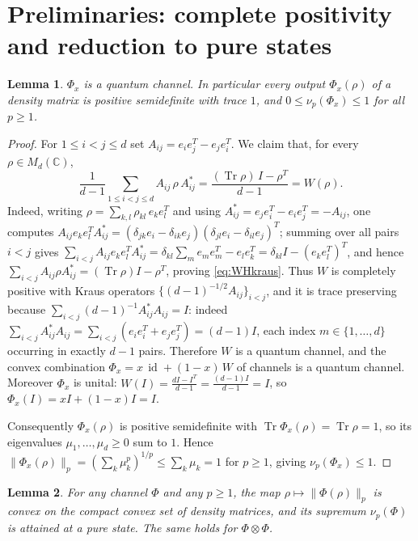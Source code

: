 \documentclass{amsart}
\newtheorem{lemma}{Lemma}
\theoremstyle{definition}
\DeclareMathOperator{\Tr}{Tr}
\DeclareMathOperator{\id}{id}
\begin{document}
\section{Preliminaries: complete positivity and reduction to pure states}
\label{sec:cptp}

\begin{lemma}\label{lem:cptp}
$\Phi_x$ is a quantum channel. In particular every output $\Phi_x(\rho)$ of a
density matrix is positive semidefinite with trace $1$, and
$0\le\nu_p(\Phi_x)\le 1$ for all $p\ge1$.
\end{lemma}

\begin{proof}
For $1\le i<j\le d$ set $A_{ij}=e_ie_j^{T}-e_je_i^{T}$. We claim that, for every
$\rho\in M_d(\mathbb C)$,
\begin{equation}\label{eq:WHkraus}
\frac{1}{d-1}\sum_{1\le i<j\le d}A_{ij}\,\rho\,A_{ij}^{*}
=\frac{(\Tr\rho)\,I-\rho^{T}}{d-1}=W(\rho).
\end{equation}
Indeed, writing $\rho=\sum_{k,l}\rho_{kl}\,e_ke_l^{T}$ and using
$A_{ij}^{*}=e_je_i^{T}-e_ie_j^{T}=-A_{ij}$, one computes
$A_{ij}e_ke_l^{T}A_{ij}^{*}
=(\delta_{jk}e_i-\delta_{ik}e_j)(\delta_{jl}e_i-\delta_{il}e_j)^{T}$;
summing over all pairs $i<j$ gives
$\sum_{i<j}A_{ij}e_ke_l^{T}A_{ij}^{*}
=\delta_{kl}\sum_{m}e_me_m^{T}-e_le_k^{T}
=\delta_{kl}I-(e_ke_l^{T})^{T}$, and hence
$\sum_{i<j}A_{ij}\rho A_{ij}^{*}=(\Tr\rho)I-\rho^{T}$, proving
\eqref{eq:WHkraus}. Thus $W$ is completely positive with Kraus operators
$\{(d-1)^{-1/2}A_{ij}\}_{i<j}$, and it is trace preserving because
$\sum_{i<j}(d-1)^{-1}A_{ij}^{*}A_{ij}=I$: indeed
$\sum_{i<j}A_{ij}^{*}A_{ij}=\sum_{i<j}(e_ie_i^{T}+e_je_j^{T})=(d-1)I$, each
index $m\in\{1,\dots,d\}$ occurring in exactly $d-1$ pairs. Therefore $W$ is a
quantum channel, and the convex combination $\Phi_x=x\,\id+(1-x)\,W$ of channels
is a quantum channel. Moreover $\Phi_x$ is unital: $W(I)=\frac{dI-I^{T}}{d-1}
=\frac{(d-1)I}{d-1}=I$, so $\Phi_x(I)=xI+(1-x)I=I$.

Consequently $\Phi_x(\rho)$ is positive semidefinite with
$\Tr\Phi_x(\rho)=\Tr\rho=1$, so its eigenvalues $\mu_1,\dots,\mu_d\ge0$ sum to
$1$. Hence $\|\Phi_x(\rho)\|_p=(\sum_k\mu_k^{p})^{1/p}\le\sum_k\mu_k=1$ for
$p\ge1$, giving $\nu_p(\Phi_x)\le1$.
\end{proof}

\begin{lemma}\label{lem:pure}
For any channel $\Phi$ and any $p\ge1$, the map
$\rho\mapsto\|\Phi(\rho)\|_p$ is convex on the compact convex set of density
matrices, and its supremum $\nu_p(\Phi)$ is attained at a pure state. The same
holds for $\Phi\otimes\Phi$.
\end{lemma}
\end{document}
